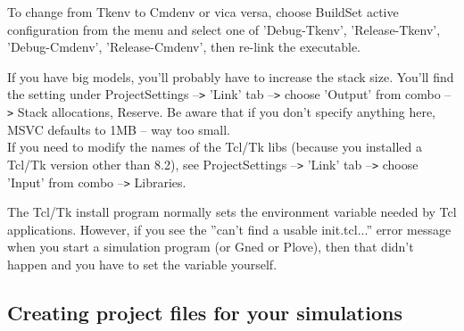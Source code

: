 \begin{sloppypar}
To change from Tkenv to Cmdenv or vica versa, choose Build{\textbar}Set 
active configuration from the menu and select one of 'Debug-Tkenv', 
'Release-Tkenv', 'Debug-Cmdenv', 'Release-Cmdenv', then re-link 
the executable.
\end{sloppypar}

If you have big models, you'll probably have to increase the stack
size. You'll find the setting under Project{\textbar}Settings
--\texttt{>} 'Link' tab --\texttt{>} choose 'Output' from combo
--\texttt{>} Stack allocations, Reserve. Be aware that if you don't
specify anything here, MSVC defaults to 1MB -- way too small.\\
If you need to modify the names of the Tcl/Tk libs (because you
installed a Tcl/Tk version other than 8.2), see
Project{\textbar}Settings --\texttt{>} 'Link' tab --\texttt{>} choose
'Input' from combo --\texttt{>} Libraries.

The Tcl/Tk install program normally sets the 
environment variable needed by Tcl applications. However, if you see
the ''can't find a usable init.tcl...'' error message when you start a
simulation program (or Gned or Plove), then that didn't happen and you
have to set the variable yourself.




\subsection{Creating project files for your simulations}

